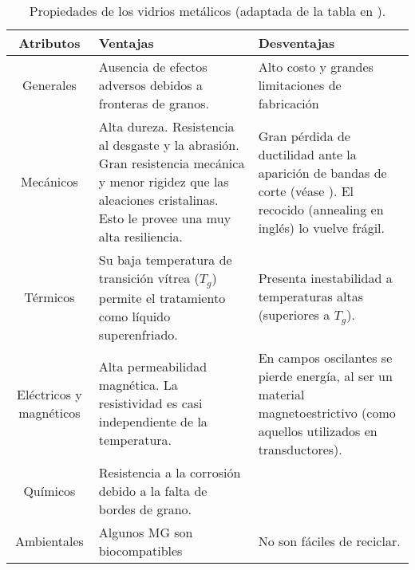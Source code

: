 \begin{table}[htp]
\begin{center}
\begin{tabular}{c C{5cm} C{5cm}}
\hline
\textbf{Atributos} & \textbf{Ventajas} & \textbf{Desventajas} \\ \hline
 \hline

Generales &
Ausencia de efectos adversos debidos a fronteras de granos. &
Alto costo y grandes limitaciones de fabricación \\ \hline
 
Mecánicos &
Alta dureza. Resistencia al desgaste y la abrasión. Gran resistencia mecánica y menor rigidez que las aleaciones cristalinas. Esto le provee una muy alta resiliencia. & 
Gran pérdida de ductilidad ante la aparición de bandas de corte (véase ). El recocido (annealing en inglés) lo vuelve frágil. \\ \hline 
 
Térmicos & 
Su baja temperatura de transición vítrea ($T_g$) permite el tratamiento como líquido superenfriado. & 
Presenta inestabilidad a temperaturas altas (superiores a $T_g$). \\ \hline

Eléctricos y magnéticos & 
Alta permeabilidad magnética. La resistividad es casi independiente de la temperatura.& 
En campos oscilantes se pierde energía, al ser un material magnetoestrictivo (como aquellos utilizados en transductores).\\ \hline

Químicos & 
Resistencia a la corrosión debido a la falta de bordes de grano.& \\ \hline

Ambientales & 
Algunos MG son biocompatibles & No son fáciles de reciclar. \\ \hline

\end{tabular}
\end{center}
\caption[Propiedades de los vidrios metálicos.]{Propiedades de los vidrios metálicos (adaptada de la tabla en \cite{ashby06}).}
\label{C1:tbl:props}
\end{table}

